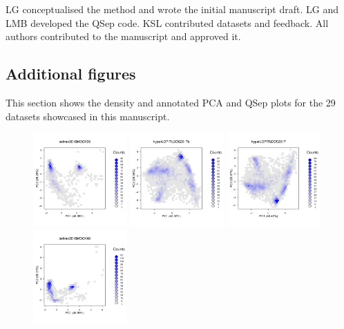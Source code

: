 \documentclass[12pt]{article}\usepackage[]{graphicx}\usepackage[]{color}
\begin{document}
LG conceptualised the method and wrote the initial manuscript
draft. LG and LMB developed the QSep code. KSL contributed datasets
and feedback. All authors contributed to the manuscript and approved
it.

\newpage

\begin{appendices}

\section{Additional figures}\label{sec:figs}

This section shows the density and annotated PCA and QSep plots for
the 29 datasets showcased in this manuscript.

\begin{figure}[htb]
  \centering
  \includegraphics[width = 0.32\textwidth]{./figure/fighexpca-1.pdf}
  \includegraphics[width = 0.32\textwidth]{./figure/fighexpca-2.pdf}
  \includegraphics[width = 0.32\textwidth]{./figure/fighexpca-3.pdf}
  \includegraphics[width = 0.32\textwidth]{./figure/fighexpca-4.pdf}

\end{figure}
\end{appendices}
\end{document}
